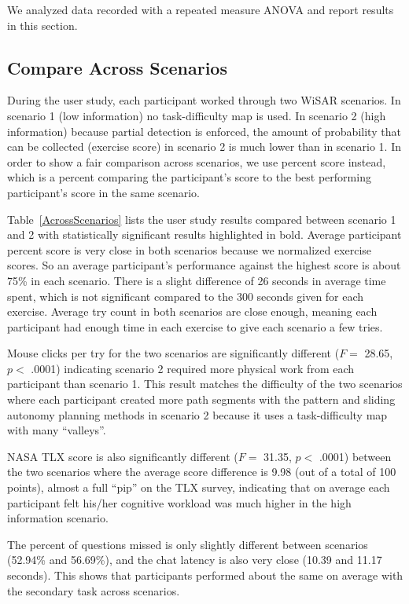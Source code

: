 \documentclass[journal]{IEEEtran}
\begin{document}
We analyzed data recorded with a repeated measure ANOVA and report results in this section.

\subsection{Compare Across Scenarios}

During the user study, each participant worked through two WiSAR scenarios. In scenario 1 (low information) no task-difficulty map is used. In scenario 2 (high information) because partial detection is enforced, the amount of probability that can be collected (exercise score) in scenario 2 is much lower than in scenario 1. In order to show a fair comparison across scenarios, we use percent score instead, which is a percent comparing the participant's score to the best performing participant's score in the same scenario.

Table~\ref{AcrossScenarios} lists the user study results compared between scenario 1 and 2 with statistically significant results highlighted in bold. Average participant percent score is very close in both scenarios because we normalized exercise scores. So an average participant's performance against the highest score is about 75\% in each scenario. There is a slight difference of 26 seconds in average time spent, which is not significant compared to the 300 seconds given for each exercise. Average try count in both scenarios are close enough, meaning each participant had enough time in each exercise to give each scenario a few tries.

Mouse clicks per try for the two scenarios are significantly different ($F=$ 28.65, $p<$ .0001) indicating scenario 2 required more physical work from each participant than scenario 1. This result matches the difficulty of the two scenarios where each participant created more path segments with the pattern and sliding autonomy planning methods in scenario 2 because it uses a task-difficulty map with many ``valleys''.

NASA TLX score is also significantly different ($F=$ 31.35, $p<$ .0001) between the two scenarios where the average score difference is 9.98 (out of a total of 100 points), almost a full ``pip'' on the TLX survey, indicating that on average each participant felt his/her cognitive workload was much higher in the high information scenario.

The percent of questions missed is only slightly different between scenarios (52.94\% and 56.69\%), and the chat latency is also very close (10.39 and 11.17 seconds). This shows that participants performed about the same on average with the secondary task across scenarios.
\end{document}
